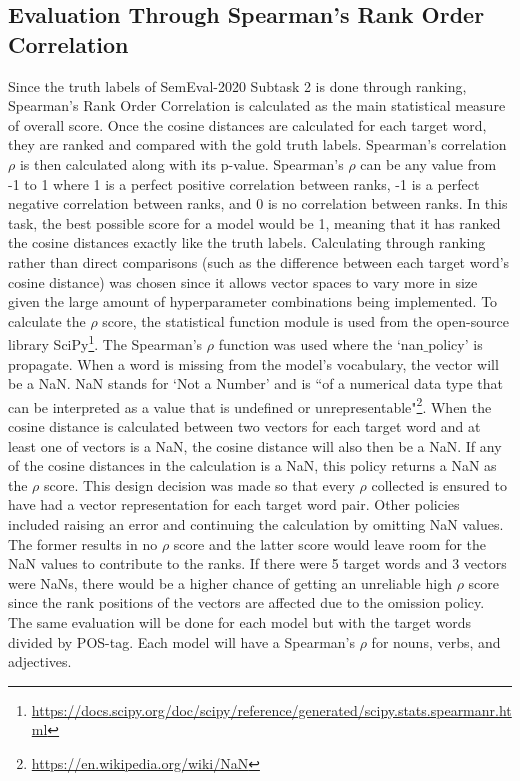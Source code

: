 \subsection{Evaluation Through Spearman's Rank Order Correlation}

Since the truth labels of SemEval-2020 Subtask 2 is done through ranking, Spearman's Rank Order Correlation is calculated as the main statistical measure of overall score. Once the cosine distances are calculated for each target word, they are ranked and compared with the gold truth labels. Spearman's correlation $\rho$ is then calculated along with its p-value. Spearman’s $\rho$ can be any value from -1 to 1 where 1 is a perfect positive correlation between ranks, -1 is a perfect negative correlation between ranks, and 0 is no correlation between ranks. In this task, the best possible score for a model would be 1, meaning that it has ranked the cosine distances exactly like the truth labels. Calculating through ranking rather than direct comparisons (such as the difference between each target word’s cosine distance) was chosen since it allows vector spaces to vary more in size given the large amount of hyperparameter combinations being implemented.  To calculate the $\rho$ score, the statistical function module is used from the open-source library SciPy\footnote{\url{https://docs.scipy.org/doc/scipy/reference/generated/scipy.stats.spearmanr.html}}. The Spearman's $\rho$ function was used where the `nan$\_$policy' is propagate. When a word is missing from the model's vocabulary, the vector will be a NaN. NaN stands for `Not a Number' and is ``of a numerical data type that can be interpreted as a value that is undefined or unrepresentable"\footnote{\url{https://en.wikipedia.org/wiki/NaN}}. When the cosine distance is calculated between two vectors for each target word and at least one of vectors is a NaN, the cosine distance will also then be a NaN. If any of the cosine distances in the calculation is a NaN, this policy returns a NaN as the $\rho$ score. This design decision was made so that every $\rho$ collected is ensured to have had a vector representation for each target word pair. Other policies included raising an error and continuing the calculation by omitting NaN values. The former results in no $\rho$ score and the latter score would leave room for the NaN values to contribute to the ranks. If there were 5 target words and 3 vectors were NaNs, there would be a higher chance of getting an unreliable high $\rho$ score since the rank positions of the vectors are affected due to the omission policy. The same evaluation will be done for each model but with the target words divided by POS-tag. Each model will have a Spearman’s $\rho$ for nouns, verbs, and adjectives. 


